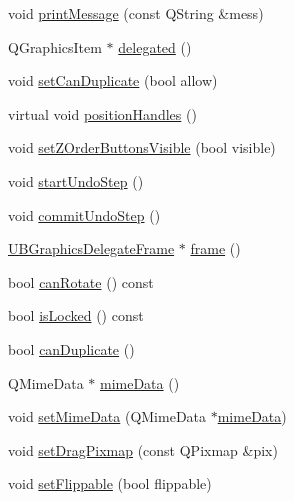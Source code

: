 \begin{DoxyCompactItemize}
\item 
void \hyperlink{class_u_b_graphics_item_delegate_acaf32845d3e0dbe7af6d3dc6c42595cb}{print\-Message} (const Q\-String \&mess)
\item 
Q\-Graphics\-Item $\ast$ \hyperlink{class_u_b_graphics_item_delegate_ad45be6a0cc44a46d51b7fd70eb5a3c79}{delegated} ()
\item 
void \hyperlink{class_u_b_graphics_item_delegate_a2f7ff1eb2e370e007f25527ef42c454e}{set\-Can\-Duplicate} (bool allow)
\item 
virtual void \hyperlink{class_u_b_graphics_item_delegate_ab5bea580591d38d488f536d80278eade}{position\-Handles} ()
\item 
void \hyperlink{class_u_b_graphics_item_delegate_acb4eac8e78e9da283c48f7cd1f24d5a7}{set\-Z\-Order\-Buttons\-Visible} (bool visible)
\item 
void \hyperlink{class_u_b_graphics_item_delegate_ac6e6021ca2e53bb636b22e49d2ff7b97}{start\-Undo\-Step} ()
\item 
void \hyperlink{class_u_b_graphics_item_delegate_a8b36311f147288058a2f5468776dd630}{commit\-Undo\-Step} ()
\item 
\hyperlink{class_u_b_graphics_delegate_frame}{U\-B\-Graphics\-Delegate\-Frame} $\ast$ \hyperlink{class_u_b_graphics_item_delegate_a20ce0529c071c4a40df4652f34238ee0}{frame} ()
\item 
bool \hyperlink{class_u_b_graphics_item_delegate_ad9e31d0b5977088ca59b6ff94c9a9b92}{can\-Rotate} () const 
\item 
bool \hyperlink{class_u_b_graphics_item_delegate_a344ec42f448a0989823fb8f85188cdac}{is\-Locked} () const 
\item 
bool \hyperlink{class_u_b_graphics_item_delegate_a1909b36a6e31a9ce2f9b461af752a42b}{can\-Duplicate} ()
\item 
Q\-Mime\-Data $\ast$ \hyperlink{class_u_b_graphics_item_delegate_aec3617785a8d9a10f1e9ca0044917778}{mime\-Data} ()
\item 
void \hyperlink{class_u_b_graphics_item_delegate_ad397d41e717526ee8bdf667294efdbe9}{set\-Mime\-Data} (Q\-Mime\-Data $\ast$\hyperlink{class_u_b_graphics_item_delegate_aec3617785a8d9a10f1e9ca0044917778}{mime\-Data})
\item 
void \hyperlink{class_u_b_graphics_item_delegate_a1d17f8df9020c02380d07dadd70bc9e4}{set\-Drag\-Pixmap} (const Q\-Pixmap \&pix)
\item 
void \hyperlink{class_u_b_graphics_item_delegate_a9572bb54e20bfe135d9560885a1e4aa8}{set\-Flippable} (bool flippable)
\item 

\end{DoxyCompactItemize}
